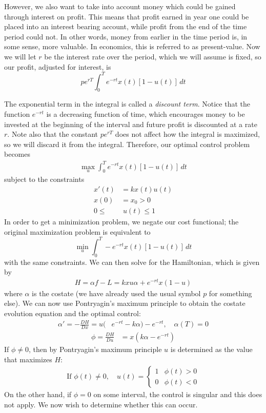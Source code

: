 However, we also want to take into account money which could be gained through interest on profit. This means that profit earned in year one could be placed into an interest bearing account, while profit from the end of the time period could not. In other words, money from earlier in the time period is, in some sense, more valuable. In economics, this is referred to as present-value. Now we will let $r$ be the interest rate over the period, which we will assume is fixed, so our profit, adjusted for interest, is
\[pe^{rT} \int_0^T e^{-rt} x(t)[1-u(t)] \, dt\]

The exponential term in the integral is called a \textit{discount term}. 
Notice that the function $e^{-rt}$ is a decreasing function of time, which encourages money to be invested at the beginning of the interval and future profit is discounted at a rate $r$. 
Note also that the constant $pe^{rT}$ does not affect how the integral is maximized, so we will discard it from the integral.
Therefore, our optimal control problem becomes
\begin{align}
\max_{u} \int_0^T e^{-rt} x(t)[1-u(t)] \, dt
\end{align}
subject to the constraints
\begin{align}
x'(t) &= kx(t)u(t) \\
 x(0) &= x_{0} > 0 \\
0 \leq&\; u(t) \leq 1
\label{eq:timberharvest:x}
\end{align}
In order to get a minimization problem, we negate our cost functional; the original maximization problem is equivalent to 
\[
\min_{u} \int_0^T -e^{-rt} x(t)[1-u(t)] \, dt
\]
with the same constraints.
We can then solve for the Hamiltonian, which is given by
\begin{align*}
H = \alpha f - L = kxu\alpha+e^{-rt}x(1-u)
\end{align*}
where \(\alpha\) is the costate (we have already used the usual symbol \(p\) for something else).
We can now use Pontryagin's maximum principle to obtain the costate evolution equation and the optimal control:
\begin{align}
\label{eq:timber:costate}
\alpha ' = -\frac{DH}{Dx}=u(&e^{-rt} - k\alpha) - e^{-rt}, \quad \alpha(T)=0
\end{align}
\begin{align}
\label{eq:timber:phi}
\phi = \frac{D H}{D u} &= x(k\alpha - e^{-rt})
\end{align}
If \(\phi\neq 0\), then by Pontryagin's maximum principle \(u\) is determined as the value that maximizes \(H\):
\begin{align}
\label{eq:timber:get_u_from_phi}
\text{If }\phi(t)\neq 0,\quad u(t)=\begin{cases} 1& \phi(t)>0 \\ 0 & \phi(t) < 0\end{cases}
\end{align}
On the other hand, if \(\phi=0\) on some interval, the control is singular and this does not apply.
We now wish to determine whether this can occur. 

